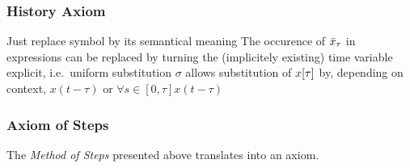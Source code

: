 \documentclass[10pt]{article}
\begin{document}


        \subsubsection{History Axiom}
            \label{history-axiom}
            Just replace symbol by its semantical meaning
            The occurence of $\bar{x}_{\tau}$ in expressions can be replaced by turning the (implicitely existing) time variable explicit, i.e.\
            uniform substitution $\sigma$
            allows substitution of $x[\tau]$ by, depending on context, $x(t-\tau)$ or $\forall{s\in[0,\tau]}{x(t-\tau)}$

            \begin{calculus}
            \end{calculus}

        \subsubsection{Axiom of Steps}
            \label{sec:axiom-of-steps}
            The \emph{Method of Steps} presented above translates into an axiom.

            \begin{calculus}

            \end{calculus}
\end{document}
